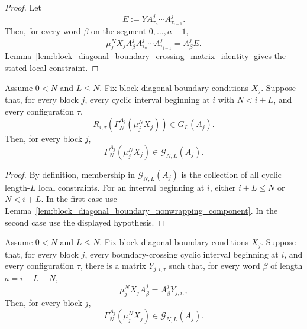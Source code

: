 \begin{proof}
    \leanok
    Let
    \[
        E:=Y A^j_{\tau_a}\cdots A^j_{\tau_{i-1}} .
    \]
    Then, for every word \(\beta\) on the segment \(0,\ldots,a-1\),
    \[
        \mu_j^N X_j A^j_\beta
        A^j_{\tau_a}\cdots A^j_{\tau_{i-1}}
        =
        A^j_\beta E.
    \]
    Lemma~\ref{lem:block_diagonal_boundary_crossing_matrix_identity} gives the
    stated local constraint.
\end{proof}

\begin{lemma}
    \label{lem:block_diagonal_boundary_component_crossing_windows_suffice}
    \leanok
    Assume \(0<N\) and \(L\le N\). Fix block-diagonal boundary conditions
    \(X_j\). Suppose that, for every block \(j\), every cyclic interval
    beginning at \(i\) with \(N<i+L\), and every configuration \(\tau\),
    \[
        R_{i,\tau}\!\left(\Gamma_N^{A_j}(\mu_j^NX_j)\right)
        \in G_L(A_j).
    \]
    Then, for every block \(j\),
    \[
        \Gamma_N^{A_j}(\mu_j^NX_j)\in \mathcal G_{N,L}(A_j).
    \]
\end{lemma}

\begin{proof}
    \leanok
    By definition, membership in \(\mathcal G_{N,L}(A_j)\) is the collection of
    all cyclic length-\(L\) local constraints. For an interval beginning at \(i\),
    either \(i+L\le N\) or \(N<i+L\). In the first case use
    Lemma~\ref{lem:block_diagonal_boundary_nonwrapping_component}. In the second
    case use the displayed hypothesis.
\end{proof}

\begin{lemma}
    \label{lem:block_diagonal_boundary_component_right_boundary_matrices}
    \leanok
    Assume \(0<N\) and \(L\le N\). Fix block-diagonal boundary conditions
    \(X_j\). Suppose that, for every block \(j\), every boundary-crossing cyclic
    interval beginning at \(i\), and every configuration \(\tau\), there is a
    matrix \(Y_{j,i,\tau}\) such that, for every word \(\beta\) of length
    \(a=i+L-N\),
    \[
        \mu_j^N X_j A^j_\beta
        =
        A^j_\beta Y_{j,i,\tau}
    \]
    Then,
    for every block \(j\),
    \[
        \Gamma_N^{A_j}(\mu_j^NX_j)\in \mathcal G_{N,L}(A_j).
    \]
\end{lemma}

